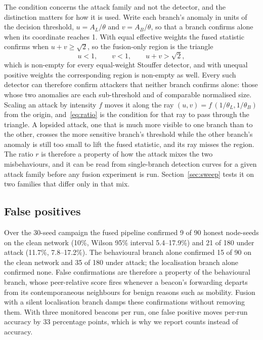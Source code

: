 The condition concerns the attack family and not the detector, and the
distinction matters for how it is used. Write each branch's anomaly in units
of the decision threshold, $u = A_L/\theta$ and $v = A_B/\theta$, so that a
branch confirms alone when its coordinate reaches 1. With equal effective
weights the fused statistic confirms when $u + v \ge \sqrt2$, so the
fusion-only region is the triangle
\begin{equation}
\label{eq:wedge}
u < 1, \qquad v < 1, \qquad u + v > \sqrt2,
\end{equation}
which is non-empty for every equal-weight Stouffer detector, and with unequal
positive weights the corresponding region is non-empty as well. Every such
detector can therefore confirm attackers that neither branch confirms alone:
those whose two anomalies are each sub-threshold and of comparable normalised
size. Scaling an attack by intensity $f$ moves it along the ray
$(u, v) = f\,(1/\theta_L, 1/\theta_B)$ from the origin, and~\eqref{eq:ratio} is
the condition for that ray to pass through the triangle. A lopsided attack,
one that is much more visible to one branch than to the other, crosses the
more sensitive branch's threshold while the other branch's anomaly is still
too small to lift the fused statistic, and its ray misses the region. The ratio $r$ is therefore a property of how the
attack mixes the two misbehaviours, and it can be read from single-branch
detection curves for a given attack family before any fusion experiment is
run. Section~\ref{sec:sweep} tests it on two families that differ only in
that mix.

\subsection{False positives}
\label{sec:fp}

Over the 30-seed campaign the fused pipeline confirmed 9 of 90 honest
node-seeds on the clean network (10\%, Wilson 95\% interval 5.4--17.9\%) and 21
of 180 under attack (11.7\%, 7.8--17.2\%). The behavioural branch alone
confirmed 15 of 90 on the clean network and 35 of 180 under attack; the
localisation branch alone confirmed none. False confirmations are therefore a
property of the behavioural branch, whose peer-relative score fires whenever a
beacon's forwarding departs from its contemporaneous neighbours for benign
reasons such as mobility. Fusion with a silent localisation branch damps
these confirmations without removing them. With three monitored beacons per run, one false
positive moves per-run accuracy by 33 percentage points, which is why we
report counts instead of accuracy.

